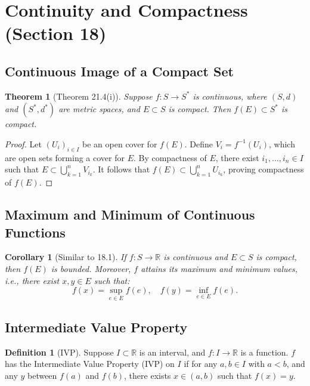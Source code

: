 \documentclass[9pt]{article}
\theoremstyle{definition}
\newtheorem{definition}{Definition}
\theoremstyle{plain}
\newtheorem{theorem}{Theorem}
\newtheorem{corollary}{Corollary}
\begin{document}
\section*{Continuity and Compactness (Section 18)}

\subsection*{Continuous Image of a Compact Set}
\begin{theorem}[Theorem 21.4(i)]
Suppose \( f : S \to S^* \) is continuous, where \( (S, d) \) and \( (S^*, d^*) \) are metric spaces, and \( E \subset S \) is compact. Then \( f(E) \subset S^* \) is compact.
\end{theorem}

\begin{proof}
Let \( (U_i)_{i \in I} \) be an open cover for \( f(E) \). Define \( V_i = f^{-1}(U_i) \), which are open sets forming a cover for \( E \). By compactness of \( E \), there exist \( i_1, \ldots, i_n \in I \) such that \( E \subset \bigcup_{k=1}^n V_{i_k} \). It follows that \( f(E) \subset \bigcup_{k=1}^n U_{i_k} \), proving compactness of \( f(E) \).
\end{proof}

\subsection*{Maximum and Minimum of Continuous Functions}
\begin{corollary}[Similar to 18.1]
If \( f : S \to \mathbb{R} \) is continuous and \( E \subset S \) is compact, then \( f(E) \) is bounded. Moreover, \( f \) attains its maximum and minimum values, i.e., there exist \( x, y \in E \) such that:
\[
f(x) = \sup_{e \in E} f(e), \quad f(y) = \inf_{e \in E} f(e).
\]
\end{corollary}

\subsection*{Intermediate Value Property}
\begin{definition}[IVP]
Suppose \( I \subset \mathbb{R} \) is an interval, and \( f : I \to \mathbb{R} \) is a function. \( f \) has the Intermediate Value Property (IVP) on \( I \) if for any \( a, b \in I \) with \( a < b \), and any \( y \) between \( f(a) \) and \( f(b) \), there exists \( x \in (a, b) \) such that \( f(x) = y \).
\end{definition}
\end{document}
